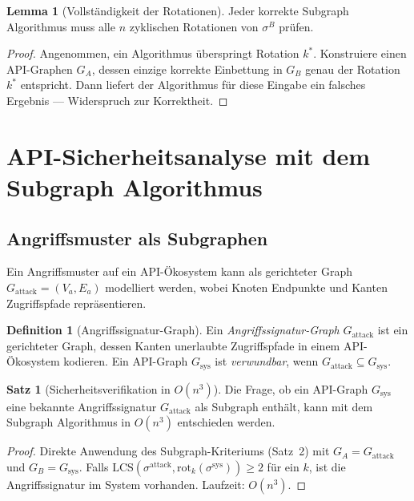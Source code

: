 ﻿\documentclass[a4paper,12pt]{article}
\theoremstyle{definition}
\newtheorem{definition}{Definition}
\newtheorem{satz}{Satz}
\newtheorem{lemma}{Lemma}
\begin{document}
\begin{lemma}[Vollständigkeit der Rotationen]
  \label{lem:rotationen}
  Jeder korrekte Subgraph Algorithmus muss alle $n$ zyklischen Rotationen von
  $\sigma^B$ prüfen.
\end{lemma}

\begin{proof}
  Angenommen, ein Algorithmus überspringt Rotation $k^*$.
  Konstruiere einen API-Graphen $G_A$, dessen einzige korrekte Einbettung in
  $G_B$ genau der Rotation $k^*$ entspricht. Dann liefert der Algorithmus
  für diese Eingabe ein falsches Ergebnis --- Widerspruch zur Korrektheit.
\end{proof}

\section{API-Sicherheitsanalyse mit dem Subgraph Algorithmus}

\subsection{Angriffsmuster als Subgraphen}

Ein Angriffsmuster auf ein API-Ökosystem kann als gerichteter Graph
$G_{\mathrm{attack}} = (V_a, E_a)$ modelliert werden, wobei Knoten Endpunkte
und Kanten Zugriffspfade repräsentieren.

\begin{definition}[Angriffssignatur-Graph]
  Ein \emph{Angriffssignatur-Graph} $G_{\mathrm{attack}}$ ist ein gerichteter
  Graph, dessen Kanten unerlaubte Zugriffspfade in einem API-Ökosystem kodieren.
  Ein API-Graph $G_{\mathrm{sys}}$ ist \emph{verwundbar}, wenn
  $G_{\mathrm{attack}} \subseteq G_{\mathrm{sys}}$.
\end{definition}

\begin{satz}[Sicherheitsverifikation in $O(n^3)$]
  Die Frage, ob ein API-Graph $G_{\mathrm{sys}}$ eine bekannte Angriffssignatur
  $G_{\mathrm{attack}}$ als Subgraph enthält, kann mit dem Subgraph Algorithmus
  in $O(n^3)$ entschieden werden.
\end{satz}

\begin{proof}
  Direkte Anwendung des Subgraph-Kriteriums (Satz~2) mit
  $G_A = G_{\mathrm{attack}}$ und $G_B = G_{\mathrm{sys}}$.
  Falls $\mathrm{LCS}(\sigma^{\mathrm{attack}}, \mathrm{rot}_k(\sigma^{\mathrm{sys}})) \geq 2$
  für ein $k$, ist die Angriffssignatur im System vorhanden. Laufzeit: $O(n^3)$.
\end{proof}
\end{document}
